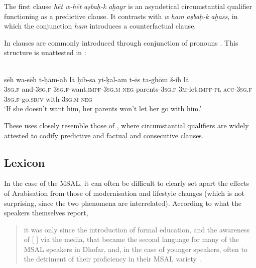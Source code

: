 \documentclass[output=paper]{langsci/langscibook}
\begin{document}
The first clause \textit{hēt} \textit{w-hēt} \textit{aṣbaḥ-k } \textit{aḫayr} is an asyndetical circumstantial qualifier functioning as a predictive  clause. It contrasts with \textit{w} \textit{ham} \textit{aṣbaḥ-k} \textit{aḫass}, in which the conjunction \textit{ham} introduces a counterfactual  clause. 

In    clauses are commonly introduced through conjunction of pronouns \citep[211]{WatsonAl-Mahriforthcoming}. This structure is unattested in  :

\ea\label{ex:key:}
{ \citep[211]{WatsonAl-Mahriforthcoming}}\\
\gll     sēh wa-sēh t-ḥam-ah lā ḥib-sa yi-ḳal-am t-ēs ta-ghōm š-ih lā\\
     \textsc{3sg.f} and-\textsc{3sg.f} \textsc{3sg.f}{}-want.\textsc{impf-3sg.m} \textsc{neg} parents-\textsc{3sg.f} \textsc{3m}-let.\textsc{impf-pl} \textsc{acc-3sg.f} \textsc{3sg.f}-go.\textsc{sbjv} with-\textsc{3sg.m} \textsc{neg}\\
\glt  `If she doesn’t want him, her parents won’t let her go with him.'\\
\z
     
These uses closely resemble those of  , where circumstantial qualifiers are widely attested to codify predictive and factual  and consecutive clauses.


 
 \subsection{Lexicon}\label{sec:key:lex}


In the case of the MSAL, it can often be difficult to clearly set apart the effects of Arabisation from those of modernisation and lifestyle changes (which is not surprising, since the two phenomena are interrelated). According to what the speakers themselves report, 

\begin{quote}
{it was only since the introduction of formal education, and the awareness of} [ ] via the media, that  became the second language for many of the MSAL speakers in Dhofar, and, in the case of younger speakers, often to the detriment of their proficiency in their MSAL variety \citep[11]{Davey2016}.
\end{quote}
\end{document}

